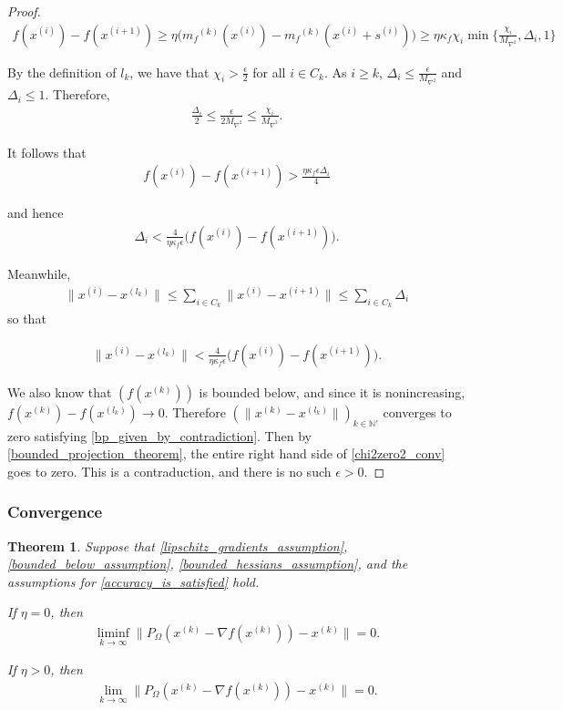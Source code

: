 \documentclass{article}
\newtheorem{theorem}{Theorem}[section]
\theoremstyle{case}
\newcommand{\gradf}{\nabla f}
\newcommand{\maxhessian}{{M_{\nabla^2}}}
\newcommand{\mfk}{{{m}_f}^{(k)}}
\newcommand{\naturals}{\mathbb N}
\newcommand{\xk}{{x^{(k)}}}
\begin{document}
\begin{proof}
\begin{align*}
f(x^{(i)}) - f(x^{(i+1)}) \ge \eta\big ( \mfk(x^{(i)}) - \mfk(x^{(i)} + s^{(i)}) \big ) \ge \eta \kappa_f \chi_i \min\{\frac{\chi_{i}}{\maxhessian}, \Delta_i, 1\} 
\end{align*}

By the definition of $l_k$, we have that $\chi_i > \frac{\epsilon}{2}$ for all $i \in C_k$.
As $i \ge k$, $\Delta_i \le \frac{\epsilon}{\maxhessian}$ and $\Delta_i \le 1$.
Therefore,
\begin{align*}
\frac{\Delta_i}{2} \le \frac{\epsilon}{2 \maxhessian} \le \frac{\chi_i}{\maxhessian}.
\end{align*}

It follows that
\begin{align*}
f(x^{(i)}) - f(x^{(i+1)}) > \frac{\eta \kappa_f \epsilon \Delta_i}{4}
\end{align*}

and hence
\begin{align*}
\Delta_i < \frac{4}{\eta \kappa_f \epsilon} \big ( f(x^{(i)}) - f(x^{(i+1)})\big ).
\end{align*}

Meanwhile,
\begin{align*}
\|x^{(i)} - x^{(l_k)}\| \le \sum_{i \in C_k}\|x^{(i)} - x^{(i+1)}\| \le \sum_{i \in C_k} \Delta_i
\end{align*}
so that

\begin{align}
\|x^{(i)} - x^{(l_k)}\| < \frac{4}{\eta \kappa_f \epsilon} \big ( f(x^{(i)}) - f(x^{(i+1)})\big ).
\end{align}

We also know that $(f(\xk))$ is bounded below, and since it is nonincreasing, $f(\xk)  - f(x^{(l_k)}) \to 0$.
Therefore $(\|\xk - x^{(l_k)}\|)_{k \in \naturals '}$ converges to zero satisfying \cref{bp_given_by_contradiction}.
Then by \cref{bounded_projection_theorem}, the entire right hand side of \cref{chi2zero2_conv} goes to zero.
This is a contraduction, and there is no such $\epsilon > 0$.
\end{proof}

\subsubsection{Convergence}

\begin{theorem}
\label{the_convergence_theorem}
Suppose that \cref{lipschitz_gradients_assumption}, \cref{bounded_below_assumption}, \cref{bounded_hessians_assumption}, and 
the assumptions for \cref{accuracy_is_satisfied} hold.

If $\eta = 0$, then
\begin{align}
\liminf_{k\to\infty} \|P_{\Omega}(\xk - \gradf(\xk)) - \xk \| = 0.
\end{align}

If $\eta > 0$, then
\begin{align}
\lim_{k\to\infty} \|P_{\Omega}(\xk - \gradf(\xk)) - \xk \| = 0.
\end{align}

\end{theorem}
\end{document}
